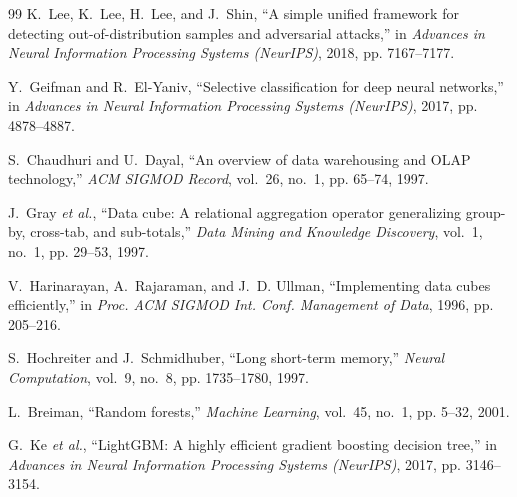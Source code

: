 \documentclass[conference]{IEEEtran}
\begin{document}
\begin{thebibliography}{99}
K.~Lee, K.~Lee, H.~Lee, and J.~Shin, ``A simple unified framework for detecting out-of-distribution samples and adversarial attacks,'' in \textit{Advances in Neural Information Processing Systems (NeurIPS)}, 2018, pp. 7167--7177.

Y.~Geifman and R.~El-Yaniv, ``Selective classification for deep neural networks,'' in \textit{Advances in Neural Information Processing Systems (NeurIPS)}, 2017, pp. 4878--4887.

S.~Chaudhuri and U.~Dayal, ``An overview of data warehousing and OLAP technology,'' \textit{ACM SIGMOD Record}, vol.~26, no.~1, pp. 65--74, 1997.

J.~Gray \textit{et al.}, ``Data cube: A relational aggregation operator generalizing group-by, cross-tab, and sub-totals,'' \textit{Data Mining and Knowledge Discovery}, vol.~1, no.~1, pp. 29--53, 1997.

V.~Harinarayan, A.~Rajaraman, and J.~D. Ullman, ``Implementing data cubes efficiently,'' in \textit{Proc. ACM SIGMOD Int. Conf. Management of Data}, 1996, pp. 205--216.

S.~Hochreiter and J.~Schmidhuber, ``Long short-term memory,'' \textit{Neural Computation}, vol.~9, no.~8, pp. 1735--1780, 1997.

L.~Breiman, ``Random forests,'' \textit{Machine Learning}, vol.~45, no.~1, pp. 5--32, 2001.

G.~Ke \textit{et al.}, ``LightGBM: A highly efficient gradient boosting decision tree,'' in \textit{Advances in Neural Information Processing Systems (NeurIPS)}, 2017, pp. 3146--3154.

\end{thebibliography}
\end{document}
